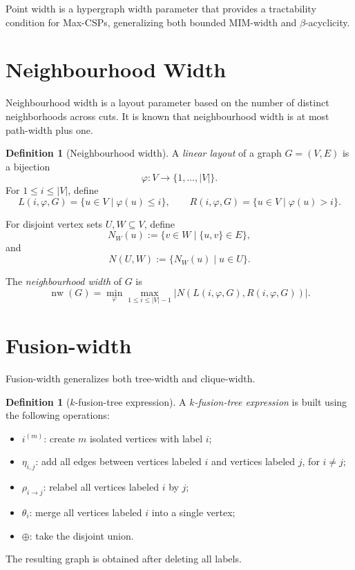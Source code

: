 \documentclass[10pt]{book}
\theoremstyle{definition}
\newtheorem{definition}[theorem]{Definition}
\begin{document}
Point width \cite{61} is a hypergraph width parameter that provides a tractability condition for Max-CSPs, generalizing both bounded MIM-width and \(\beta\)-acyclicity.

\section{Neighbourhood Width}
Neighbourhood width \cite{62,63} is a layout parameter based on the number of distinct neighborhoods across cuts.  
It is known that neighbourhood width is at most path-width plus one.

\begin{definition}[Neighbourhood width]
\cite{62,63}
A \emph{linear layout} of a graph \(G=(V,E)\) is a bijection
\[
\varphi:V\to \{1,\dots,|V|\}.
\]
For \(1\leq i\leq |V|\), define
\[
L(i,\varphi,G)=\{u\in V\mid \varphi(u)\leq i\},
\qquad
R(i,\varphi,G)=\{u\in V\mid \varphi(u)>i\}.
\]

For disjoint vertex sets \(U,W\subseteq V\), define
\[
N_W(u):=\{v\in W\mid \{u,v\}\in E\},
\]
and
\[
N(U,W):=\{N_W(u)\mid u\in U\}.
\]

The \emph{neighbourhood width} of \(G\) is
\[
\operatorname{nw}(G)=
\min_{\varphi}
\max_{1\leq i\leq |V|-1}
|N(L(i,\varphi,G),R(i,\varphi,G))|.
\]
\end{definition}

\section{Fusion-width}
Fusion-width \cite{64} generalizes both tree-width and clique-width.

\begin{definition}[\(k\)-fusion-tree expression]
\cite{64}
A \emph{\(k\)-fusion-tree expression} is built using the following operations:
\begin{itemize}
    \item \(i^{(m)}\): create \(m\) isolated vertices with label \(i\);
    \item \(\eta_{i,j}\): add all edges between vertices labeled \(i\) and vertices labeled \(j\), for \(i\neq j\);
    \item \(\rho_{i\to j}\): relabel all vertices labeled \(i\) by \(j\);
    \item \(\theta_i\): merge all vertices labeled \(i\) into a single vertex;
    \item \(\oplus\): take the disjoint union.
\end{itemize}
The resulting graph is obtained after deleting all labels.
\end{definition}
\end{document}
